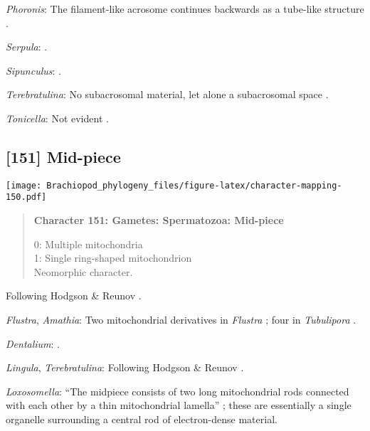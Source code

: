 \documentclass[openany]{book}
\theoremstyle{definition}
\theoremstyle{definition}
\theoremstyle{definition}
\theoremstyle{remark}
\begin{document}
\hypertarget{Phoronis-coding-150}{}
\emph{Phoronis}: The filament-like acrosome continues backwards as a
tube-like structure \citep[summarized in
\citet{Jamieson1991FishEvolution}]{Franzen1980Ultrastructureof}.

\hypertarget{Serpula-coding-150}{}
\emph{Serpula}: \citet{Gherardi2011}.

\hypertarget{Sipunculus-coding-150}{}
\emph{Sipunculus}: \citet{Rice1993}.

\hypertarget{Terebratulina-coding-150}{}
\emph{Terebratulina}: No subacrosomal material, let alone a subacrosomal
space \citep[e.g.][]{Hodgson1994Ultrastructureof}.

\hypertarget{Tonicella-coding-150}{}
\emph{Tonicella}: Not evident \citep{BucklandNicks1988}.

\subsection*{{[}151{]} Mid-piece}\label{mid-piece}

\texttt{[image: Brachiopod\_phylogeny\_files/figure-latex/character-mapping-150.pdf]}

\begin{quote}
\textbf{Character 151: Gametes: Spermatozoa: Mid-piece}

0: Multiple mitochondria\\
1: Single ring-shaped mitochondrion\\
Neomorphic character.
\end{quote}

Following Hodgson \& Reunov \citeyearpar{Hodgson1994Ultrastructureof}.

\hypertarget{Amathia-coding-151}{}
\emph{Flustra}, \emph{Amathia}: Two mitochondrial derivatives in
\emph{Flustra} \citep{Franzen1981, Franzen1977}; four in
\emph{Tubulipora} \citep{Franzen1984}.

\hypertarget{Dentalium-coding-151}{}
\emph{Dentalium}: \citet{DufresneDube1983}.

\hypertarget{Lingula-coding-151}{}
\emph{Lingula}, \emph{Terebratulina}: Following Hodgson \& Reunov
\citeyearpar{Hodgson1994Ultrastructureof}.

\hypertarget{Loxosomella-coding-151}{}
\emph{Loxosomella}: ``The midpiece consists of two long mitochondrial
rods connected with each other by a thin mitochondrial lamella''
\citep[in \emph{Loxosoma}]{Franzen2000}; these are essentially a single
organelle surrounding a central rod of electron-dense material.
\end{document}
